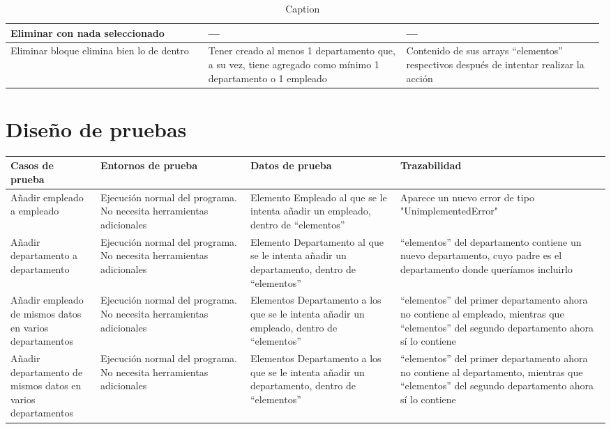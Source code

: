\documentclass{article}
\begin{document}
\begin{table}
\begin{tabular}{|>{\raggedright\arraybackslash}p{0.33\linewidth}|>{\raggedright\arraybackslash}p{0.33\linewidth}|>{\raggedright\arraybackslash}p{0.33\linewidth}|}
        Eliminar con nada seleccionado &  ---& ---\\ \hline 
        Eliminar bloque elimina bien lo de dentro &  Tener creado al menos 1 departamento que, a su vez, tiene agregado como mínimo 1 departamento o 1 empleado& Contenido de sus arrays “elementos” respectivos después de intentar realizar la acción\\ \hline
    \end{tabular}
    \caption{Caption}
    \label{tab:my_label}
\end{table}

\section{Diseño de pruebas}

\begin{table}
    \centering
    \begin{tabular}{|>{\raggedright\arraybackslash}p{0.15\linewidth}|>{\raggedright\arraybackslash}p{0.25\linewidth}|>{\raggedright\arraybackslash}p{0.25\linewidth}|>{\raggedright\arraybackslash}p{0.35\linewidth}|} \hline 
        \textbf{Casos de prueba} & \textbf{Entornos de prueba} & \textbf{Datos de prueba} & \textbf{Trazabilidad}\\ \hline 
         Añadir empleado a empleado&  Ejecución normal del programa. No necesita herramientas adicionales&  Elemento Empleado al que se le intenta añadir un empleado, dentro de “elementos”&Aparece un nuevo error de tipo "UnimplementedError"\\ \hline 
         Añadir departamento a departamento&  Ejecución normal del programa. No necesita herramientas adicionales&  Elemento Departamento al que se le intenta añadir un departamento, dentro de “elementos”&“elementos” del departamento contiene un nuevo departamento, cuyo padre es el departamento donde queríamos incluirlo\\ \hline 
         Añadir empleado de mismos datos en varios departamentos&  Ejecución normal del programa. No necesita herramientas adicionales&  Elementos Departamento a los que se le intenta añadir un empleado, dentro de “elementos”&“elementos” del primer departamento ahora no contiene al empleado, mientras que “elementos” del segundo departamento ahora sí lo contiene\\ \hline 
         Añadir departamento de mismos datos en varios departamentos&  Ejecución normal del programa. No necesita herramientas adicionales&  Elementos Departamento a los que se le intenta añadir un departamento, dentro de “elementos”&“elementos” del primer departamento ahora no contiene al departamento, mientras que “elementos” del segundo departamento ahora sí lo contiene\\ \hline 

\end{tabular}
\end{table}
\end{document}
